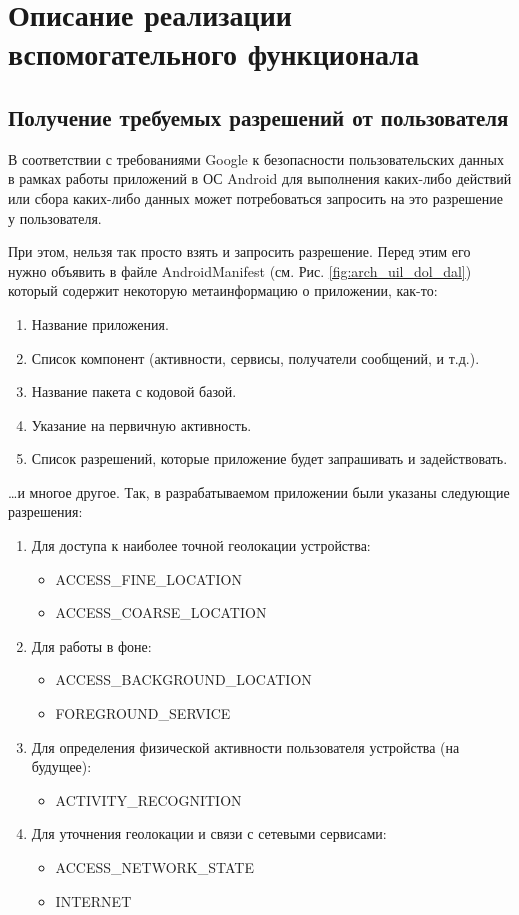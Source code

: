 \chapter{Описание реализации вспомогательного функционала}
\section{Получение требуемых разрешений от пользователя}
В соответствии с требованиями Google к безопасности пользовательских данных в рамках работы приложений в ОС Android для выполнения каких-либо действий или сбора каких-либо данных может потребоваться запросить на это разрешение у пользователя.

При этом, нельзя так просто взять и запросить разрешение. Перед этим его нужно объявить в файле AndroidManifest (см. Рис. \ref{fig:arch_uil_dol_dal}) который содержит некоторую метаинформацию о приложении, как-то:
\begin{enumerate}
	\item Название приложения.
	\item Список компонент (активности, сервисы, получатели сообщений, и т.д.).
	\item Название пакета с кодовой базой.
	\item Указание на первичную активность.
	\item Список разрешений, которые приложение будет запрашивать и задействовать.
\end{enumerate}
\dots и многое другое.
Так, в разрабатываемом приложении были указаны следующие разрешения:
\begin{enumerate}
	\item Для доступа к наиболее точной геолокации устройства:
	\begin{itemize}
		\item ACCESS\_FINE\_LOCATION
		\item ACCESS\_COARSE\_LOCATION
	\end{itemize}
	\item Для работы в фоне:
	\begin{itemize}
		\item ACCESS\_BACKGROUND\_LOCATION
		\item FOREGROUND\_SERVICE
	\end{itemize}
	\item Для определения физической активности пользователя устройства (на будущее):
	\begin{itemize}
		\item ACTIVITY\_RECOGNITION
	\end{itemize}
		\item Для уточнения геолокации и связи с сетевыми сервисами:
	\begin{itemize}
		\item ACCESS\_NETWORK\_STATE
		\item INTERNET
	\end{itemize}
\end{enumerate}
